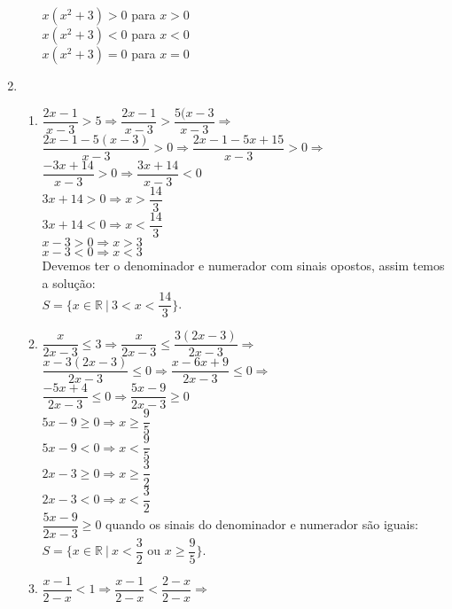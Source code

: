 \documentclass[10pt]{book}
\begin{document}
\begin{enumerate}
\begin{enumerate}
		$x(x^2 + 3) > 0$ para $x > 0$\\
		$x(x^2 + 3) < 0$ para $x < 0$\\
		$x(x^2 + 3) = 0$ para $x = 0$\\		
		\end{enumerate}
	\item
		\begin{enumerate}\addtocounter{enumii}{7}
			\item
			$\dfrac{2x - 1}{x - 3} > 5 \Rightarrow \dfrac{2x - 1}{x - 3} > \dfrac{5(x - 3}{x - 3}\Rightarrow $\\[6pt]
			$\dfrac{2x - 1 - 5(x - 3)}{x - 3} > 0 \Rightarrow \dfrac{2x - 1 - 5x + 15}{x - 3} > 0 \Rightarrow $\\[6pt]
			$\dfrac{-3x + 14}{x - 3} > 0 \Rightarrow \dfrac{3x + 14}{x - 3} < 0$\\[6pt]
			$3x + 14 > 0 \Rightarrow x > \dfrac{14}{3}$\\[6pt]
			$3x + 14 < 0 \Rightarrow x < \dfrac{14}{3}$\\[6pt]
			$x - 3 > 0 \Rightarrow x > 3$\\
			$x - 3 < 0 \Rightarrow x < 3$\\
			Devemos ter o denominador e numerador com sinais opostos, assim temos a solução:\\
			$S =  \lbrace x \in \mathbb{R} \ |\ 3 < x < \dfrac{14}{3} \rbrace$.
			\item
			$\dfrac{x}{2x - 3}\leq 3 \Rightarrow \dfrac{x}{2x - 3} \leq \dfrac{3(2x - 3)}{2x - 3} \Rightarrow$\\[6pt]
			$\dfrac{x - 3(2x - 3)}{2x - 3} \leq 0 \Rightarrow \dfrac{x - 6x + 9}{2x - 3} \leq 0 \Rightarrow $\\[6pt]
			$\dfrac{-5x + 4}{2x - 3} \leq 0 \Rightarrow \dfrac{5x - 9}{2x - 3} \geq 0 $\\[6pt]
			$5x - 9 \geq 0 \Rightarrow x \geq \dfrac{9}{5}$\\[6pt]
			$5x - 9 < 0 \Rightarrow x < \dfrac{9}{5}$\\[6pt]
			$2x - 3 \geq 0 \Rightarrow x \geq \dfrac{3}{2}$\\[6pt]
			$2x - 3 < 0 \Rightarrow x < \dfrac{3}{2}$\\[6pt]
			$\dfrac{5x - 9}{2x - 3} \geq 0$  quando os sinais do denominador e numerador são iguais:\\[6pt]
			$S =  \lbrace x \in \mathbb{R} \ |\ x < \dfrac{3}{2}$ ou $x \geq \dfrac{9}{5}\rbrace$.
			\item
			$\dfrac{x - 1}{2 - x} < 1 \Rightarrow \dfrac{x - 1}{2 - x} < \dfrac{2 - x}{2 - x}\Rightarrow$\\[6pt]

\end{enumerate}
\end{enumerate}
\end{document}
